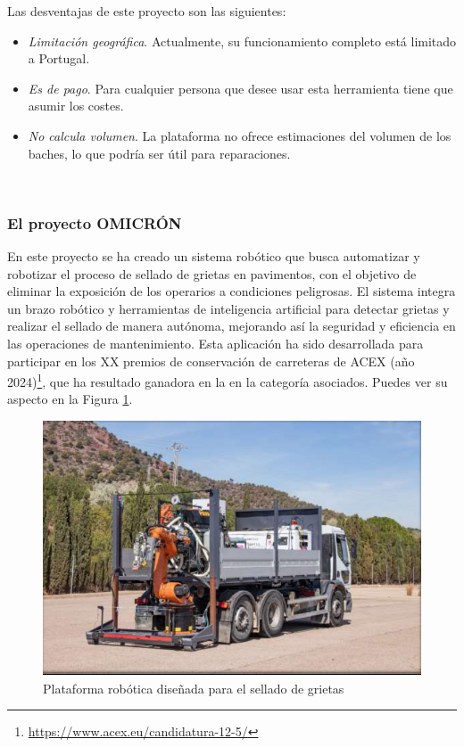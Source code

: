 Las desventajas de este proyecto son las siguientes:
\begin{itemize}
	\item \textit{Limitación geográfica}. Actualmente, su funcionamiento completo está limitado a Portugal.
	\item \textit{Es de pago}. Para cualquier persona que desee usar esta herramienta tiene que asumir los costes.
	\item \textit{No calcula volumen}. La plataforma no ofrece estimaciones del volumen de los baches, lo que podría ser útil para reparaciones.
	
\end{itemize}\


\subsubsection{El proyecto OMICRÓN}
\label{subsubsec:sistema4}

En este proyecto se ha creado un sistema robótico que busca automatizar y robotizar el proceso de sellado de grietas en pavimentos, con el objetivo de eliminar la exposición de los operarios a condiciones peligrosas. El sistema integra un brazo robótico y herramientas de inteligencia artificial para detectar grietas y realizar el sellado de manera autónoma, mejorando así la seguridad y eficiencia en las operaciones de mantenimiento. Esta aplicación ha sido desarrollada para participar en los XX premios de conservación de carreteras de \ac{ACEX} (año 2024)\footnote{\url{https://www.acex.eu/candidatura-12-5/}}, que ha resultado ganadora en la en la categoría asociados. Puedes ver su aspecto en la Figura \ref{fig:omicron}.

\begin{figure} [h!]
	\begin{center}
		\includegraphics[width=16cm]{figs/omicron.png}
	\end{center}
	\caption{Plataforma robótica diseñada para el sellado de grietas}
	\label{fig:omicron}
\end{figure}

